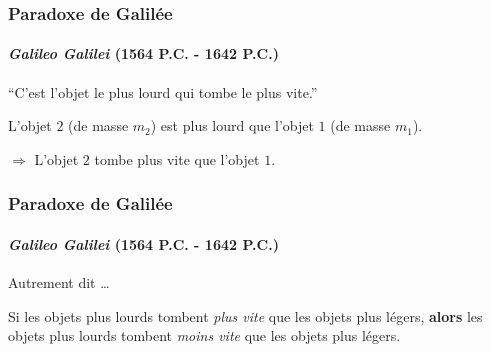 \documentclass[usenames, dvipsnames, no-framenumber]{beamer}
\begin{document}
\begin{frame}%
\frametitle{Paradoxe de Galilée}
\framesubtitle{\textit{Galileo Galilei} (1564 P.C. - 1642 P.C.)}

\vspace{-8mm}
\begin{center}
``C'est l'objet le plus lourd qui tombe le plus vite.''
\end{center}

L'objet $2$ (de masse $m_2$) est plus lourd que l'objet $1$ (de masse $m_1$).

$\Rightarrow$ L'objet $2$ tombe plus vite que l'objet $1$.





\end{frame}

\begin{frame}%
\frametitle{Paradoxe de Galilée}
\framesubtitle{\textit{Galileo Galilei} (1564 P.C. - 1642 P.C.)}

Autrement dit \dots

Si les objets plus lourds tombent \emph{plus vite} que les objets plus légers, \textbf{alors} les objets plus lourds tombent \emph{moins vite} que les objets plus légers.



\end{frame}
\end{document}
